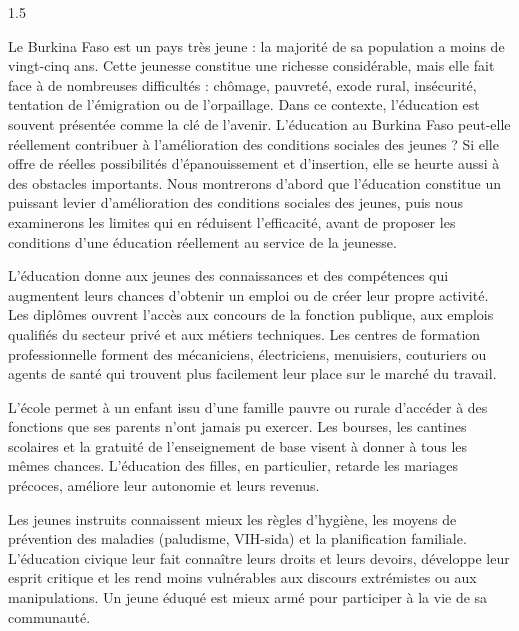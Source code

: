 \documentclass[12pt]{article}
\begin{document}
\begin{spacing}{1.5}


Le Burkina Faso est un pays très jeune : la majorité de sa population a moins de vingt-cinq ans. Cette jeunesse constitue une richesse considérable, mais elle fait face à de nombreuses difficultés : chômage, pauvreté, exode rural, insécurité, tentation de l'émigration ou de l'orpaillage. Dans ce contexte, l'éducation est souvent présentée comme la clé de l'avenir. L'éducation au Burkina Faso peut-elle réellement contribuer à l'amélioration des conditions sociales des jeunes ? Si elle offre de réelles possibilités d'épanouissement et d'insertion, elle se heurte aussi à des obstacles importants. Nous montrerons d'abord que l'éducation constitue un puissant levier d'amélioration des conditions sociales des jeunes, puis nous examinerons les limites qui en réduisent l'efficacité, avant de proposer les conditions d'une éducation réellement au service de la jeunesse.


L'éducation donne aux jeunes des connaissances et des compétences qui augmentent leurs chances d'obtenir un emploi ou de créer leur propre activité. Les diplômes ouvrent l'accès aux concours de la fonction publique, aux emplois qualifiés du secteur privé et aux métiers techniques. Les centres de formation professionnelle forment des mécaniciens, électriciens, menuisiers, couturiers ou agents de santé qui trouvent plus facilement leur place sur le marché du travail.

L'école permet à un enfant issu d'une famille pauvre ou rurale d'accéder à des fonctions que ses parents n'ont jamais pu exercer. Les bourses, les cantines scolaires et la gratuité de l'enseignement de base visent à donner à tous les mêmes chances. L'éducation des filles, en particulier, retarde les mariages précoces, améliore leur autonomie et leurs revenus.

Les jeunes instruits connaissent mieux les règles d'hygiène, les moyens de prévention des maladies (paludisme, VIH-sida) et la planification familiale. L'éducation civique leur fait connaître leurs droits et leurs devoirs, développe leur esprit critique et les rend moins vulnérables aux discours extrémistes ou aux manipulations. Un jeune éduqué est mieux armé pour participer à la vie de sa communauté.


\end{spacing}
\end{document}
